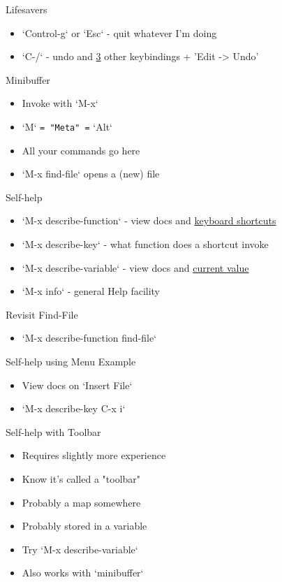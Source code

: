 \documentclass[bigger]{beamer}
\begin{document}
\begin{frame}[label=sec-3-2]{Lifesavers}
\begin{itemize}
\item `Control-g` or `Esc` - quit whatever I'm doing
\item `C-/` - undo and \uline{3} other keybindings + 'Edit -> Undo'
\end{itemize}
\end{frame}

\begin{frame}[fragile,label=sec-3-3]{Minibuffer}
 \begin{itemize}
\item Invoke with `M-x`
\item `M` \texttt{= "Meta" =} `Alt`
\item All your commands go here
\item `M-x find-file` opens a (new) file
\end{itemize}
\end{frame}

\begin{frame}[label=sec-3-4]{Self-help}
\begin{itemize}
\item `M-x describe-function` - view docs and \uline{keyboard shortcuts}
\item `M-x describe-key` - what function does a shortcut invoke
\item `M-x describe-variable` - view docs and \uline{current value}
\item `M-x info` - general Help facility
\end{itemize}
\end{frame}

\begin{frame}[label=sec-3-5]{Revisit Find-File}
\begin{itemize}
\item `M-x describe-function find-file`
\end{itemize}
\end{frame}

\begin{frame}[label=sec-3-6]{Self-help using Menu Example}
\begin{itemize}
\item View docs on `Insert File`
\item `M-x describe-key C-x i`
\end{itemize}
\end{frame}

\begin{frame}[label=sec-3-7]{Self-help with Toolbar}
\begin{itemize}
\item Requires slightly more experience
\item Know it's called a "toolbar"
\item Probably a map somewhere
\item Probably stored in a variable
\item Try `M-x describe-variable`
\item Also works with `minibuffer`
\end{itemize}
\end{frame}
\end{document}
